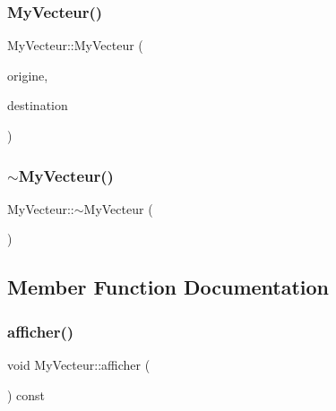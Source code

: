 \mbox{\label{classMyVecteur_a4e2be89ea76ce4e062603a1a5f139eb7}} 
\subsubsection{\texorpdfstring{My\+Vecteur()}{MyVecteur()}\hspace{0.1cm}{\footnotesize\ttfamily [2/2]}}
{\footnotesize\ttfamily My\+Vecteur\+::\+My\+Vecteur (\begin{DoxyParamCaption}\item[{const \hyperlink{classMyPoint}{My\+Point} \&}]{origine,  }\item[{const \hyperlink{classMyPoint}{My\+Point} \&}]{destination }\end{DoxyParamCaption})}

\mbox{\label{classMyVecteur_aed208f92ee2d2f6e9c316f9688349c37}} 
\subsubsection{\texorpdfstring{$\sim$\+My\+Vecteur()}{~MyVecteur()}}
{\footnotesize\ttfamily My\+Vecteur\+::$\sim$\+My\+Vecteur (\begin{DoxyParamCaption}{ }\end{DoxyParamCaption})}



\subsection{Member Function Documentation}
\mbox{\label{classMyVecteur_a1a7d4d738cc650239c18d0f1c0d88e3f}} 
\subsubsection{\texorpdfstring{afficher()}{afficher()}}
{\footnotesize\ttfamily void My\+Vecteur\+::afficher (\begin{DoxyParamCaption}{ }\end{DoxyParamCaption}) const}

